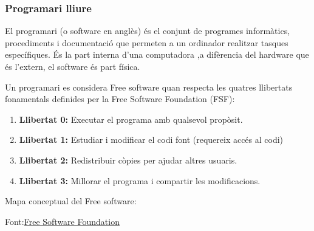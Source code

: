 \subsubsection{Programari lliure}

El programari (o software en anglès) és el conjunt de programes informàtics, procediments i documentació que permeten a un ordinador realitzar tasques específiques. És la part interna d'una computadora ,a difèrencia del hardware que és l'extern, el software és part física.

Un programari es considera Free software quan respecta les quatres llibertats fonamentals definides per la Free Software Foundation (FSF):
\begin{enumerate}
 \item  \textbf{Llibertat 0:} Executar el programa amb qualsevol propòsit.
 \item  \textbf{Llibertat 1:} Estudiar i modificar el codi font (requereix accés al codi)
 \item  \textbf{Llibertat 2:} Redistribuir còpies per ajudar altres usuaris.
 \item  \textbf{Llibertat 3:} Millorar el programa i compartir les modificacions.
\end{enumerate}

Mapa conceptual del Free software:
\begin{center}
\hspace{-27mm}
\end{center}

Font:\href{https://www.fsf.org/}{Free Software Foundation}

